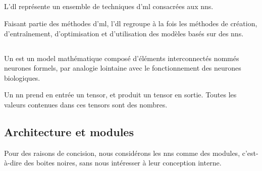 \subsection{}
\label{subsec:dl} \label{def:dl}
L'\gls{dl} représente un ensemble de techniques d'\gls{ml} consacrées aux \glspl{nn}.

Faisant partie des méthodes d'\gls{ml}, l'\gls{dl} regroupe à la fois les méthodes de création, d'entraînement, d'optimisation et d'utilisation des modèles basés sur des \glspl{nn}.

\subsection{}
\label{def:nn}
\label{def:tensor}

Un  est un \gls{model} mathématique composé d'éléments interconnectés nommés neurones formels, %
par analogie lointaine avec le fonctionnement des neurones biologiques.

Un \gls{nn} prend en entrée un \gls{tensor}, %
et produit un \gls{tensor} en sortie.
Toutes les valeurs contenues dans ces \glspl{tensor} sont des nombres.


\subsection{Architecture et modules}
\label{def:module} \label{def:architecture}
Pour des raisons de concision, nous considérons les \glspl{nn} comme des \glspl{module}, c'est-à-dire des boites noires,
sans nous intéresser à leur conception interne.

